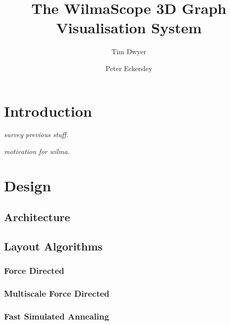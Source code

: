 \documentclass[runningheads]{cl2emult}
\begin{document}
%
\title*{The WilmaScope 3D Graph Visualisation System}
%
%
%
%
%
\author{Tim Dwyer
\and Peter Eckersley
}
%
%
%

\maketitle              %


\section{Introduction}\label{sec:intro}
\em{survey previous stuff.}

\em{motivation for wilma.}
%
\section{Design}\label{sec:design}
\subsection{Architecture}
\subsection{Layout Algorithms}
\subsubsection{Force Directed}
\subsubsection{Multiscale Force Directed}
\subsubsection{Fast Simulated Annealing}
\end{document}

